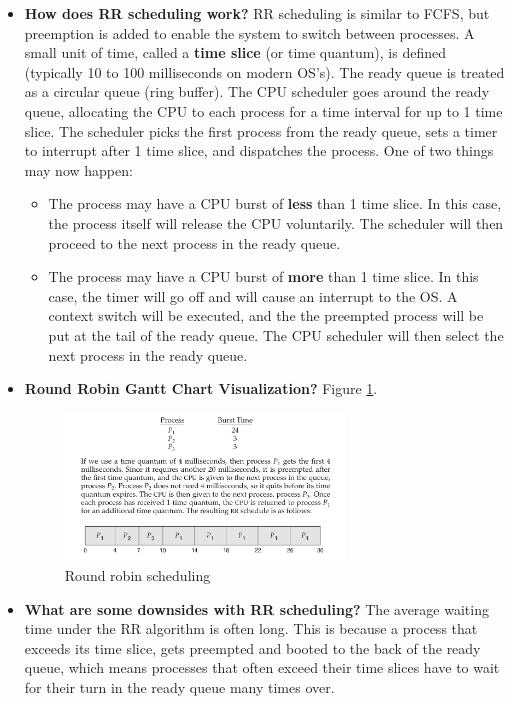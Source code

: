 \documentclass[12pt]{article}
\begin{document}
\begin{itemize}
    \item \textbf{How does RR scheduling work?} RR scheduling is similar to FCFS, but preemption is added to enable the system to switch between processes. A small unit of time, called a \textbf{time slice} (or time quantum), is defined (typically 10 to 100 milliseconds on modern OS's). The ready queue is treated as a circular queue (ring buffer). The CPU scheduler goes around the ready queue, allocating the CPU to each process for a time interval for up to 1 time slice. The scheduler picks the first process from the ready queue, sets a timer to interrupt after 1 time slice, and dispatches the process. One of two things may now happen:
        \begin{itemize}
            \item The process may have a CPU burst of \textbf{less} than 1 time slice. In this case, the process itself will release the CPU voluntarily. The scheduler will then proceed to the next process in the ready queue.
            \item The process may have a CPU burst of \textbf{more} than 1 time slice. In this case, the timer will go off and will cause an interrupt to the OS. A context switch will be executed, and the the preempted process will be put at the tail of the ready queue. The CPU scheduler will then select the next process in the ready queue.
        \end{itemize}
    \item \textbf{Round Robin Gantt Chart Visualization?} Figure \ref{fig:rr-scheduling}.
        \begin{figure}[ht]
            \centering
            \includegraphics[width=0.7\textwidth]{figures/rr-scheduling.jpg}
            \caption{Round robin scheduling}
            \label{fig:rr-scheduling}
        \end{figure}
    \item \textbf{What are some downsides with RR scheduling?} The average waiting time under the RR algorithm is often long. This is because a process that exceeds its time slice, gets preempted and booted to the back of the ready queue, which means processes that often exceed their time slices have to wait for their turn in the ready queue many times over.

\end{itemize}
\end{document}
